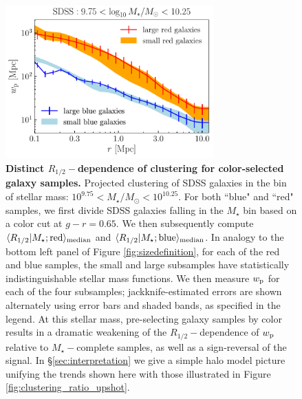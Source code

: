 \documentclass[usenatbib,usegraphicx,letterpaper]{mn2e}
\newcommand{\rhalf}{R_{1/2}}
\newcommand{\mstar}{M_{\star}}
\newcommand{\wproj}{w_{\rm p}}
\newcommand{\median}[2]{\langle{#1}\vert{#2}\rangle_{\rm median}}
\newcommand{\msun}{M_\odot}
\begin{document}
\begin{figure}
\centering
\includegraphics[width=8cm]{FIGS/color_selected_size_dependent_clustering.pdf}
\caption{
{\bf Distinct $\rhalf-$dependence of clustering for color-selected galaxy samples.}
Projected clustering of SDSS galaxies in the bin of stellar mass: $10^{9.75}<\mstar/\msun<10^{10.25}.$ For both ``blue" and ``red" samples, we first divide SDSS galaxies falling in the $\mstar$ bin based on a color cut at $g-r=0.65.$ We then subsequently compute $\median{\rhalf}{\mstar; {\rm red}}$ and $\median{\rhalf}{\mstar; {\rm blue}}$. In analogy to the bottom left panel of Figure \ref{fig:sizedefinition}, for each of the red and blue samples, the small and large subsamples have statistically indistinguishable stellar mass functions. We then measure $\wproj$ for each of the four subsamples; jackknife-estimated errors are shown alternately using error bars and shaded bands, as specified in the legend. At this stellar mass, pre-selecting galaxy samples by color results in a dramatic weakening of the $\rhalf-$dependence of $\wproj$ relative to $\mstar-$complete samples, as well as a sign-reversal of the signal. In \S\ref{sec:interpretation} we give a simple halo model picture unifying the trends shown here with those illustrated in Figure \ref{fig:clustering_ratio_upshot}.
}
\label{fig:colorclustering}
\end{figure}
\end{document}
